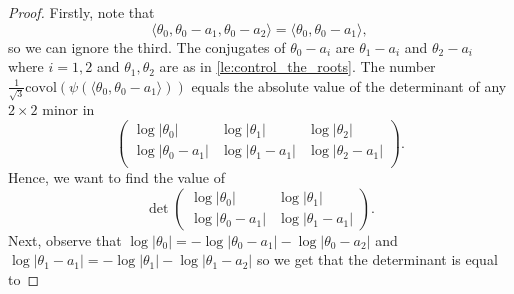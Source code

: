 \documentclass[11pt,letterpaper]{amsart}
\theoremstyle{definition}
\theoremstyle{remark}
\begin{document}
	\begin{proof}
		Firstly, note that 
		\begin{equation}
			\langle \theta_0, \theta_0 - a_1, \theta_0 - a_2 \rangle 
			= 
			\langle \theta_0, \theta_0 - a_1 \rangle , 
		\end{equation}
		so we can ignore the third. 
		The conjugates of $\theta_0- a_i$ are $\theta_1 - a_i$ and $\theta_2-a_i$ where $i=1,2$ and $\theta_1,\theta_2$ are as in  \cref{le:control_the_roots}. 
		The number $	\frac{1}{\sqrt{3}}\mathrm{covol}(\psi\left( \langle \theta_0, \theta_0-a_1\rangle \right))$ equals the absolute value of the determinant of any $2\times 2$ minor in
		\begin{equation}
			\left(
			\begin{matrix}
				\log|\theta_0| & \log |\theta_1| & \log |\theta_2| \\
				\log|\theta_0 - a_1| & \log |\theta_1 - a_1| & \log |\theta_2 - a_1|\\
			\end{matrix}
			\right).
		\end{equation}
		Hence, we want to find the value of 
		\begin{equation}
			\det\left(
			\begin{matrix}
				\log|\theta_0| & \log |\theta_1| \\
				\log|\theta_0 - a_1 | & \log |\theta_1 - a_1| 
			\end{matrix}
			\right).
		\end{equation}
		Next, observe that $\log |\theta_0| = - \log |\theta_0 - a_1| - \log |\theta_0 - a_2|$ and $\log|\theta_1 - a_1| = - \log |\theta_1| - \log |\theta_1 - a_2|$ so we get that the determinant is equal to 

\end{proof}
\end{document}
